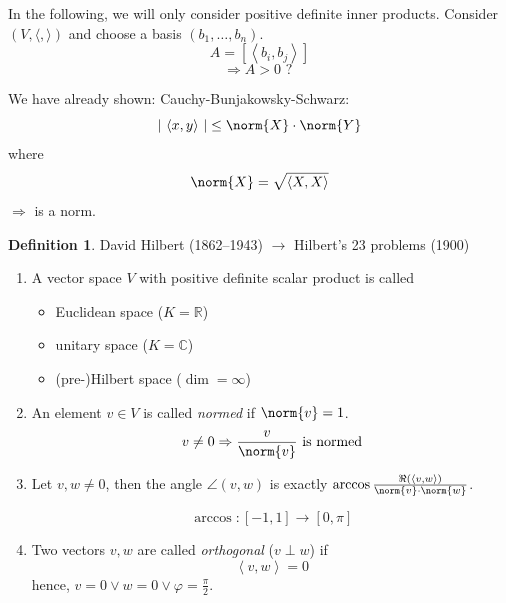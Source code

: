 \documentclass[a4paper,landscape,twocolumn]{article}
\newcommand\abs[1]{|\,#1\,|}
\newcommand\functional[1]{\left\langle{#1}\right\rangle}
\theoremstyle{definition}
\newtheorem{defi}{Definition}
\DeclarePairedDelimiter\norm\lVert\rVert
\begin{document}
In the following, we will only consider positive definite inner products.
Consider $(V, \langle, \rangle)$ and choose a basis $(b_1, \ldots, b_n)$.
\[ A = [\functional{b_i, b_j}] \]
\[ \Rightarrow A > 0 \text{ ? } \]

We have already shown: Cauchy-Bunjakowsky-Schwarz:
\[ \abs{\functional{x,y}} \leq \norm{X} \cdot \norm{Y} \]
where
\[ \norm{X} = \sqrt{\functional{X,X}} \]
$\Rightarrow$ is a norm.

\begin{defi}
  \label{defi-8.33}
  David Hilbert (1862--1943) $\rightarrow$ Hilbert's 23 problems (1900)

  \begin{enumerate}
    \item
      A vector space $V$ with positive definite scalar product is called
      \begin{itemize}
        \item Euclidean space ($K = \mathbb R$)
        \item unitary space ($K = \mathbb C$)
        \item (pre-)Hilbert space ($\dim = \infty$)
      \end{itemize}

    \item
      An element $v \in V$ is called \emph{normed} if $\norm{v} = 1$.
      \[ v \neq 0 \Rightarrow \frac{v}{\norm{v}} \text{ is normed} \]

    \item
      Let $v, w \neq 0$, then the angle $\angle(v, w)$ is exactly
      $\arccos{\frac{\Re(\functional{v,w})}{\norm{v} \cdot \norm{w}}}$.

      \[ \arccos: [-1,1] \to [0,\pi] \]

    \item
      Two vectors $v,w$ are called \emph{orthogonal} ($v \perp w$) if
      \[ \functional{v,w} = 0 \]
      hence, $v = 0 \lor w = 0 \lor \varphi = \frac{\pi}{2}$.
  \end{enumerate}
\end{defi}
\end{document}

